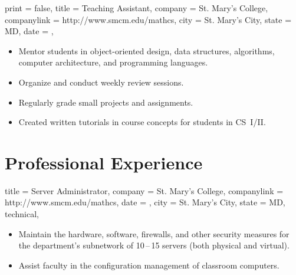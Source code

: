 \documentclass{bettercv}
\begin{document}
\begin{position}
  {
    print   = false,
    title   = Teaching Assistant,
    company = St. Mary's College,%
    companylink = http://www.smcm.edu/mathcs,
    city    = St. Mary's City,
    state   = MD,
    date    = ,
  }

\begin{itemize}
\item Mentor students in object-oriented design, data structures, algorithms, computer architecture, and programming languages.
\item Organize and conduct weekly review sessions.
\item Regularly grade small projects and assignments.
\item Created written tutorials in course concepts for students in CS~I\slash II.
\end{itemize}
\end{position}

\vfill
\section{Professional Experience}

\begin{position}
  {
    title   = Server Administrator,
    company = St. Mary's College,%
    companylink = http://www.smcm.edu/mathcs,
    date    = ,
    city    = St. Mary's City,
    state   = MD,
    technical,
  }

\begin{itemize}
\item Maintain the hardware, software, firewalls, and other security measures
  for the department's subnetwork of 10\,--\,15 servers (both physical and virtual).
\item Assist faculty in the configuration management of classroom computers.
\end{itemize}
\end{position}
\end{document}
